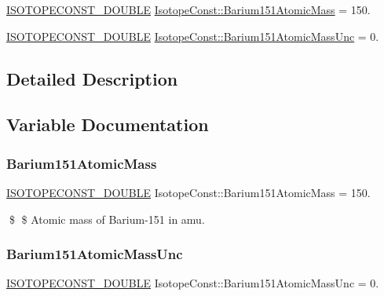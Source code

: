 \begin{DoxyCompactItemize}
\item 
\mbox{\hyperlink{group___isotope_const-_macros_ga8f45a7272ce02c0b4c65c44636ed719a}{I\+S\+O\+T\+O\+P\+E\+C\+O\+N\+S\+T\+\_\+\+D\+O\+U\+B\+LE}} \mbox{\hyperlink{group___isotope_const-_barium-_ba151_ga9830d4c65c8184dd1083f0cebf27f68e}{Isotope\+Const\+::\+Barium151\+Atomic\+Mass}} = 150.
\item 
\mbox{\hyperlink{group___isotope_const-_macros_ga8f45a7272ce02c0b4c65c44636ed719a}{I\+S\+O\+T\+O\+P\+E\+C\+O\+N\+S\+T\+\_\+\+D\+O\+U\+B\+LE}} \mbox{\hyperlink{group___isotope_const-_barium-_ba151_ga78ec794ef692ecb706f705e70f393f2f}{Isotope\+Const\+::\+Barium151\+Atomic\+Mass\+Unc}} = 0.
\end{DoxyCompactItemize}


\subsection{Detailed Description}


\subsection{Variable Documentation}
\mbox{\label{group___isotope_const-_barium-_ba151_ga9830d4c65c8184dd1083f0cebf27f68e}} 
\subsubsection{\texorpdfstring{Barium151\+Atomic\+Mass}{Barium151AtomicMass}}
{\footnotesize\ttfamily \mbox{\hyperlink{group___isotope_const-_macros_ga8f45a7272ce02c0b4c65c44636ed719a}{I\+S\+O\+T\+O\+P\+E\+C\+O\+N\+S\+T\+\_\+\+D\+O\+U\+B\+LE}} Isotope\+Const\+::\+Barium151\+Atomic\+Mass = 150.}

\$ \$ Atomic mass of Barium-\/151 in amu. \mbox{\label{group___isotope_const-_barium-_ba151_ga78ec794ef692ecb706f705e70f393f2f}} 
\subsubsection{\texorpdfstring{Barium151\+Atomic\+Mass\+Unc}{Barium151AtomicMassUnc}}
{\footnotesize\ttfamily \mbox{\hyperlink{group___isotope_const-_macros_ga8f45a7272ce02c0b4c65c44636ed719a}{I\+S\+O\+T\+O\+P\+E\+C\+O\+N\+S\+T\+\_\+\+D\+O\+U\+B\+LE}} Isotope\+Const\+::\+Barium151\+Atomic\+Mass\+Unc = 0.}

